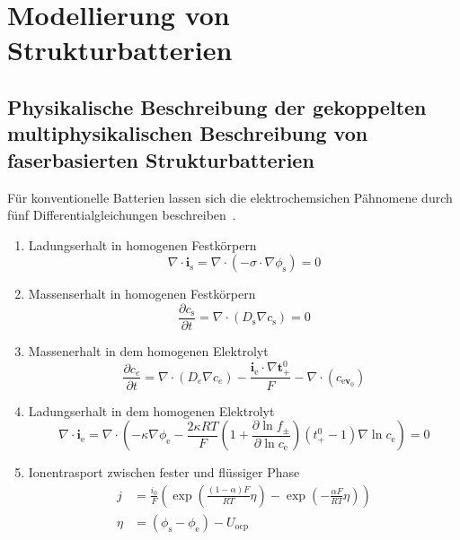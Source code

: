 \chapter{Modellierung von Strukturbatterien}

\section{Physikalische Beschreibung der gekoppelten multiphysikalischen Beschreibung von faserbasierten Strukturbatterien}

Für konventionelle Batterien lassen sich die elektrochemsichen Pähnomene durch fünf Differentialgleichungen beschreiben~\cite{Plett2015}.
\begin{enumerate}
    \item Ladungserhalt in homogenen Festkörpern
    \begin{equation}
        \nabla \cdot \boldsymbol{i}_{\text{s}} = \nabla \cdot \left( - \sigma \cdot \nabla \phi_{\text{s}} \right) = 0
    \end{equation}

    \item Massenserhalt in homogenen Festkörpern
    \begin{equation}
        \frac{\partial c_{\text{s}}}{\partial t}  = \nabla \cdot \left( D_{\text{s}} \nabla c_{\text{s}} \right) = 0
    \end{equation}

    \item Massenerhalt in dem homogenen Elektrolyt
    \begin{equation}
        \frac{\partial c_e}{\partial t} = \nabla \cdot \left( D_e   \nabla c_e \right) - \frac{\boldsymbol{i}_{\text{e}} \cdot    \nabla \boldsymbol{t}_+^0}{F} - \nabla \cdot \left( c_{\text   {e} \boldsymbol{v}_0}\right)
    \end{equation}

    \item Ladungserhalt  in dem homogenen Elektrolyt
    \begin{equation}
        \nabla \cdot \boldsymbol{i}_{\text{e}} = \nabla \cdot \left(    - \kappa \nabla \phi_{\text{e}}  -\frac{2\kappa RT}{F} \left(  1+ \frac{\partial \ln f_\pm}{\partial \ln c_{\text{e}}}\right)   \left( t_+^0-1\right) \nabla \ln c_{\text{e}} \right) = 0
    \end{equation}

    \item Ionentrasport zwischen fester und flüssiger Phase
    \begin{align}
        j &= \frac{i_0}{F}\left( \exp \left(\frac{\left(1-\alpha\right)  F}{RT}\eta \right) - \exp \left(-\frac{\alpha F}{RT}  \eta\right) \right)\\
        \eta &= (\phi_{\text{s}}-\phi_{\text{e}}) - U_{\text{ocp}}
    \end{align}
\end{enumerate}

